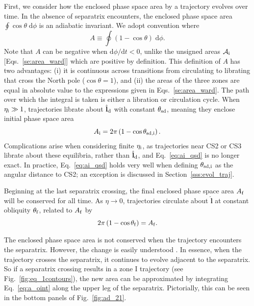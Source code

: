 \documentclass[twocolumn,twocolappendix]{aastex63}
\newcommand*{\rdil}[2]{\mathrm{d}#1 / \mathrm{d}#2}
\newcommand*{\bsmb}[1]{\boldsymbol{\mathbf{#1}}}
\newcommand*{\uv}[1]{\hat{\bsmb{#1}}}
\newcommand*{\p}[1]{\left(#1\right)}
\begin{document}
First, we consider how the enclosed phase space area by a trajectory evolves
over time. In the absence of separatrix encounters, the enclosed phase space
area $\oint \cos\theta \;\mathrm{d}\phi$ is an adiabatic invariant. We adopt
convention where
\begin{equation}
    A \equiv \oint \p{1 - \cos \theta}\;\mathrm{d}\phi.\label{eq:a_oint}
\end{equation}
\textcolor{Corr}{Note that $A$ can be negative when $\rdil{\phi}{t} < 0$, unlike
the unsigned areas $\mathcal{A}_{\rm i}$ [Eqs.~\eqref{se:area_ward}] which are
positive by definition.} This definition
of $A$ has two advantages: (i) it is continuous across transitions from
circulating to librating that cross the North pole ($\cos \theta = 1$), and (ii)
the areas of the three zones are equal in absolute value to the expressions
given in Eqs.~\eqref{se:area_ward}. The path over which the integral is taken is
either a libration or circulation cycle. When $\eta_{\rm i} \gg 1$, trajectories
librate about $\uv{l}_{\rm d}$ with constant $\theta_{\rm sd}$, meaning they
enclose initial phase space area
\begin{equation}
    A_{\rm i} = 2\pi\p{1 - \cos \theta_{\rm sd, i}}.\label{eq:ai_qsd}
\end{equation}
Complications arise when considering finite $\eta_{\rm i}$, as trajectories near
CS2 or CS3 librate about these equilibria, rather than $\uv{l}_{\rm d}$, and
Eq.~\eqref{eq:ai_qsd} is no longer exact. In practice, Eq.~\eqref{eq:ai_qsd}
holds very well when defining $\theta_{\rm sd, i}$ as the angular distance to
CS2; an exception is discussed in Section~\ref{sss:evol_traj}.

Beginning at the last separatrix crossing, the final enclosed phase space area
$A_{\rm f}$ will be conserved for all time. As $\eta \to 0$, trajectories
circulate about $\uv{l}$ at constant obliquity $\theta_{\rm f}$, related to
$A_{\rm f}$ by
\begin{equation}
    2\pi\p{1 - \cos \theta_{\rm f}} = A_{\rm f}. \label{eq:qfaf}
\end{equation}

The enclosed phase space area is not conserved when the trajectory encounters
the separatrix. However, the change is easily understood \citep{henrard1982}. In
essence, when the trajectory crosses the separatrix, it continues to evolve
adjacent to the separatrix. So if a separatrix crossing results in a zone I
trajectory (see Fig.~\ref{fig:eq_1contours}), the new area can be approximated
by integrating Eq.~\eqref{eq:a_oint} along the upper leg of the separatrix.
Pictorially, this can be seen in the bottom panels of Fig.~\ref{fig:ad_21}.
\end{document}
